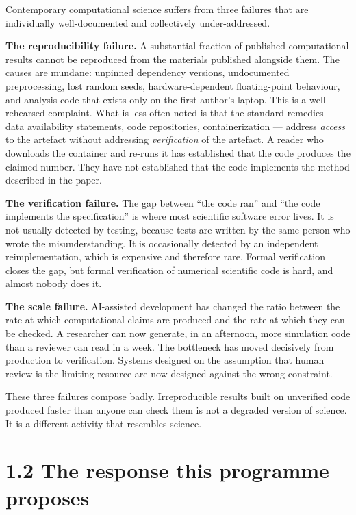 \documentclass[
  11pt]{report}
\begin{document}
Contemporary computational science suffers from three failures that are
individually well-documented and collectively under-addressed.

\textbf{The reproducibility failure.} A substantial fraction of
published computational results cannot be reproduced from the materials
published alongside them. The causes are mundane: unpinned dependency
versions, undocumented preprocessing, lost random seeds,
hardware-dependent floating-point behaviour, and analysis code that
exists only on the first author's laptop. This is a well-rehearsed
complaint. What is less often noted is that the standard remedies ---
data availability statements, code repositories, containerization ---
address \emph{access} to the artefact without addressing
\emph{verification} of the artefact. A reader who downloads the
container and re-runs it has established that the code produces the
claimed number. They have not established that the code implements the
method described in the paper.

\textbf{The verification failure.} The gap between ``the code ran'' and
``the code implements the specification'' is where most scientific
software error lives. It is not usually detected by testing, because
tests are written by the same person who wrote the misunderstanding. It
is occasionally detected by an independent reimplementation, which is
expensive and therefore rare. Formal verification closes the gap, but
formal verification of numerical scientific code is hard, and almost
nobody does it.

\textbf{The scale failure.} AI-assisted development has changed the
ratio between the rate at which computational claims are produced and
the rate at which they can be checked. A researcher can now generate, in
an afternoon, more simulation code than a reviewer can read in a week.
The bottleneck has moved decisively from production to verification.
Systems designed on the assumption that human review is the limiting
resource are now designed against the wrong constraint.

These three failures compose badly. Irreproducible results built on
unverified code produced faster than anyone can check them is not a
degraded version of science. It is a different activity that resembles
science.

\hypertarget{the-response-this-programme-proposes}{%
\section{1.2 The response this programme
proposes}\label{the-response-this-programme-proposes}}
\end{document}
